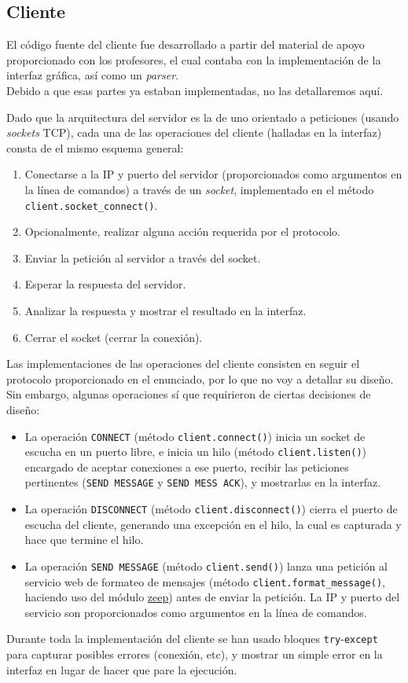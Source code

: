 \subsection{Cliente}

El código fuente del cliente fue desarrollado a partir del material de apoyo proporcionado con los profesores, el cual contaba con la implementación de la interfaz gráfica, así como un \textit{parser}.\\
Debido a que esas partes ya estaban implementadas, no las detallaremos aquí.\newline

Dado que la arquitectura del servidor es la de uno orientado a peticiones (usando \textit{sockets} TCP), cada una de las operaciones del cliente (halladas en la interfaz) consta de el mismo esquema general:
\begin{enumerate}
    \item Conectarse a la IP y puerto del servidor (proporcionados como argumentos en la línea de comandos) a través de un \textit{socket}, implementado en el método \texttt{client.socket\_connect()}.
    \item Opcionalmente, realizar alguna acción requerida por el protocolo.
    \item Enviar la petición al servidor a través del socket.
    \item Esperar la respuesta del servidor.
    \item Analizar la respuesta y mostrar el resultado en la interfaz.
    \item Cerrar el socket (cerrar la conexión).
\end{enumerate}

Las implementaciones de las operaciones del cliente consisten en seguir el protocolo proporcionado en el enunciado, por lo que no voy a detallar su diseño.\\
Sin embargo, algunas operaciones sí que requirieron de ciertas decisiones de diseño:
\begin{itemize}
    \item La operación \texttt{CONNECT} (método \texttt{client.connect()}) inicia un socket de escucha en un puerto libre, e inicia un hilo (método \texttt{client.listen()}) encargado de aceptar conexiones a ese puerto, recibir las peticiones pertinentes (\texttt{SEND MESSAGE} y \texttt{SEND MESS ACK}), y mostrarlas en la interfaz.
    \item La operación \texttt{DISCONNECT} (método \texttt{client.disconnect()}) cierra el puerto de escucha del cliente, generando una excepción en el hilo, la cual es capturada y hace que termine el hilo.
    \item La operación \texttt{SEND MESSAGE} (método \texttt{client.send()}) lanza una petición al servicio web de formateo de mensajes (método \texttt{client.format\_message()}, haciendo uso del módulo \href{https://pypi.org/project/zeep/}{zeep}) antes de enviar la petición. La IP y puerto del servicio son proporcionados como argumentos en la línea de comandos.
\end{itemize}

Durante toda la implementación del cliente se han usado bloques \texttt{try}-\texttt{except} para capturar posibles errores (conexión, etc), y mostrar un simple error en la interfaz en lugar de hacer que pare la ejecución.